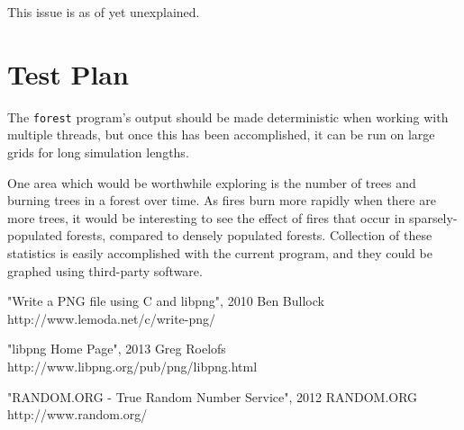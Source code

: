 \documentclass[11pt,a4paper]{report}
\begin{document}
This issue is as of yet unexplained.


\section{Test Plan}

The \texttt{forest} program's output should be made deterministic when working
with multiple threads, but once this has been accomplished, it can be run on
large grids for long simulation lengths.

One area which would be worthwhile exploring is the number of trees and burning
trees in a forest over time. As fires burn more rapidly when there are more
trees, it would be interesting to see the effect of fires that occur in
sparsely-populated forests, compared to densely populated forests. Collection
of these statistics is easily accomplished with the current program, and they
could be graphed using third-party software.


\begin{thebibliography}{99}

"Write a PNG file using C and libpng", 2010 Ben Bullock
http://www.lemoda.net/c/write-png/

"libpng Home Page", 2013 Greg Roelofs
http://www.libpng.org/pub/png/libpng.html

"RANDOM.ORG - True Random Number Service", 2012 RANDOM.ORG
http://www.random.org/

\end{thebibliography}
\end{document}
